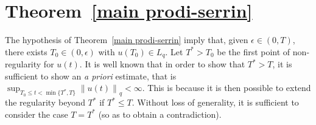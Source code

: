 \documentclass[12pt]{amsart}
\theoremstyle{remark}
\newcommand{\snormo}[1]{{\mathopen\|#1\mathclose\|}}
\begin{document}
\section{Theorem~\ref{main prodi-serrin}}
\label{simple}

The hypothesis of Theorem~\ref{main prodi-serrin} imply that, 
given $\epsilon \in (0,T)$, there exists
$T_0 \in (0,\epsilon)$ with $u(T_0) \in  L_q$.
Let $T^* > T_0$ be the first point of non-regularity for $u(t)$.
It is well known that 
in order to show that $T^* > T$,
it is sufficient to show an \emph{a priori} estimate, that is
$\sup_{T_0 \le t < \min\{T^*,T\}} \snormo{u(t)}_q < \infty$.
This is because it is then possible to extend the regularity beyond
$T^*$ if $T^* \le T$.
Without loss of generality, it is sufficient to consider the case
$T = T^*$ (so as to obtain a contradiction).
\end{document}
